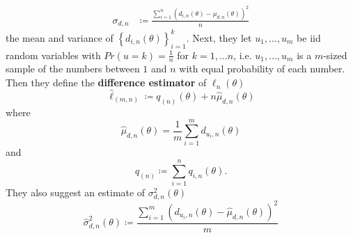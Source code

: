 {\begin{equation*}
\begin{split}
    \sigma_{d,n} &\coloneqq \frac{\sum_{i=1}^n\left(d_{i,n}\left(\theta\right) - \mu_{d,n}\left(\theta\right)\right)^2}{n}
\end{split}
\end{equation*}{}
the mean and variance of $\left\{d_{i,n}\left(\theta\right)\right\}_{i=1}^k$. Next, they let $u_1, \ldots, u_m$ be iid random variables with $Pr\left(u = k\right) = \frac{1}{n}$ for $k = 1, \ldots n$, i.e. $u_1, \ldots, u_m$ is a $m$-sized sample of the numbers between $1$ and $n$ with equal probability of each number.  
Then they define the \textbf{difference estimator} of $\ell_n\left(\theta\right)$
\begin{equation}
    \hat{\ell}_{\left(m,n\right)}\coloneqq q_{\left(n\right)}\left(\theta\right) + n\hat{\mu}_{d,n}\left(\theta\right) 
\end{equation}
where 
\begin{equation*}
    \hat{\mu}_{d,n}\left(\theta\right) = \frac{1}{m}\sum_{i=1}^m d_{u_i,n}\left(\theta\right)
\end{equation*}{}
and 
\begin{equation*}
    q_{\left(n\right)} \coloneqq \sum_{i=1}^n q_{i,n}\left(\theta\right).
\end{equation*}
They also suggest an estimate of $\sigma_{d,n}^2\left(\theta\right)$
\begin{equation}
    \hat{\sigma}_{d,n}^2\left(\theta\right) \coloneqq \frac{\sum_{i = 1}^m \left(d_{u_i, n}\left(\theta\right) - \hat{\mu}_{d,n}\left(\theta\right)\right)^2}{m} 
\end{equation}

}
